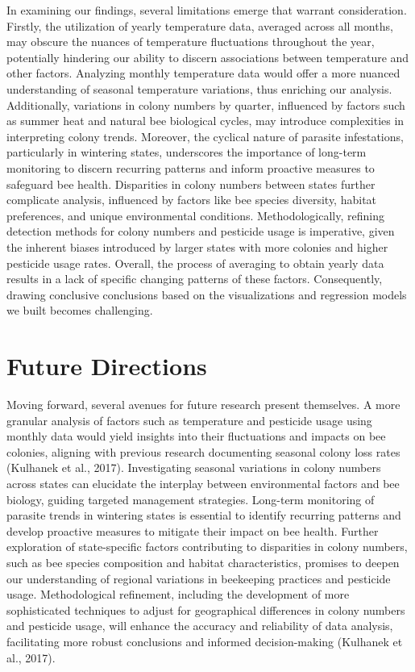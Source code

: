 \documentclass[
  letterpaper,
  DIV=11,
  numbers=noendperiod]{scrartcl}
\begin{document}
In examining our findings, several limitations emerge that warrant
consideration. Firstly, the utilization of yearly temperature data,
averaged across all months, may obscure the nuances of temperature
fluctuations throughout the year, potentially hindering our ability to
discern associations between temperature and other factors. Analyzing
monthly temperature data would offer a more nuanced understanding of
seasonal temperature variations, thus enriching our analysis.
Additionally, variations in colony numbers by quarter, influenced by
factors such as summer heat and natural bee biological cycles, may
introduce complexities in interpreting colony trends. Moreover, the
cyclical nature of parasite infestations, particularly in wintering
states, underscores the importance of long-term monitoring to discern
recurring patterns and inform proactive measures to safeguard bee
health. Disparities in colony numbers between states further complicate
analysis, influenced by factors like bee species diversity, habitat
preferences, and unique environmental conditions. Methodologically,
refining detection methods for colony numbers and pesticide usage is
imperative, given the inherent biases introduced by larger states with
more colonies and higher pesticide usage rates. Overall, the process of
averaging to obtain yearly data results in a lack of specific changing
patterns of these factors. Consequently, drawing conclusive conclusions
based on the visualizations and regression models we built becomes
challenging.

\section{Future Directions}\label{future-directions}

Moving forward, several avenues for future research present themselves.
A more granular analysis of factors such as temperature and pesticide
usage using monthly data would yield insights into their fluctuations
and impacts on bee colonies, aligning with previous research documenting
seasonal colony loss rates (Kulhanek et al., 2017). Investigating
seasonal variations in colony numbers across states can elucidate the
interplay between environmental factors and bee biology, guiding
targeted management strategies. Long-term monitoring of parasite trends
in wintering states is essential to identify recurring patterns and
develop proactive measures to mitigate their impact on bee health.
Further exploration of state-specific factors contributing to
disparities in colony numbers, such as bee species composition and
habitat characteristics, promises to deepen our understanding of
regional variations in beekeeping practices and pesticide usage.
Methodological refinement, including the development of more
sophisticated techniques to adjust for geographical differences in
colony numbers and pesticide usage, will enhance the accuracy and
reliability of data analysis, facilitating more robust conclusions and
informed decision-making (Kulhanek et al., 2017).
\end{document}
